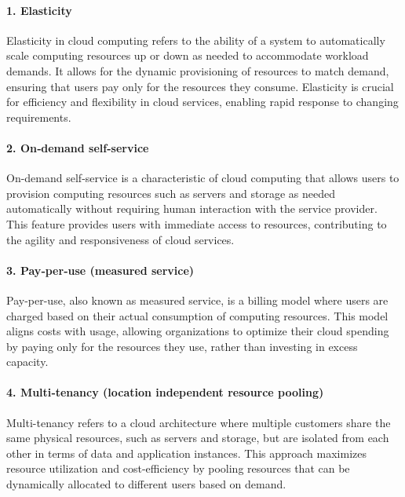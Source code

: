 \documentclass[10pt, landscape]{article}
\begin{document}
\begin{multicols*}{4}
\paragraph{1. Elasticity}\label{elasticity}

Elasticity in cloud computing refers to the ability of a system to
automatically scale computing resources up or down as needed to
accommodate workload demands. It allows for the dynamic provisioning of
resources to match demand, ensuring that users pay only for the
resources they consume. Elasticity is crucial for efficiency and
flexibility in cloud services, enabling rapid response to changing
requirements.

\paragraph{2. On‐demand self-service}\label{ondemand-self-service}

On-demand self-service is a characteristic of cloud computing that
allows users to provision computing resources such as servers and
storage as needed automatically without requiring human interaction with
the service provider. This feature provides users with immediate access
to resources, contributing to the agility and responsiveness of cloud
services.

\paragraph{3. Pay‐per‐use (measured
service)}\label{payperuse-measured-service}

Pay-per-use, also known as measured service, is a billing model where
users are charged based on their actual consumption of computing
resources. This model aligns costs with usage, allowing organizations to
optimize their cloud spending by paying only for the resources they use,
rather than investing in excess capacity.

\paragraph{4. Multi‐tenancy (location independent resource
pooling)}\label{multitenancy-location-independent-resource-pooling}

Multi-tenancy refers to a cloud architecture where multiple customers
share the same physical resources, such as servers and storage, but are
isolated from each other in terms of data and application instances.
This approach maximizes resource utilization and cost-efficiency by
pooling resources that can be dynamically allocated to different users
based on demand.


\end{multicols*}
\end{document}
